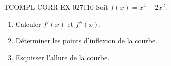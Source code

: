 \begin{exercice}{TCOMPL-CORR-EX-027}{1}{10}
Soit $f(x) = x^4 - 2x^2$.
\begin{enumerate}
  \item Calculer $f'(x)$ et $f''(x)$.
  \item Déterminer les points d'inflexion de la courbe.
  \item Esquisser l'allure de la courbe.
\end{enumerate}

\end{exercice}
